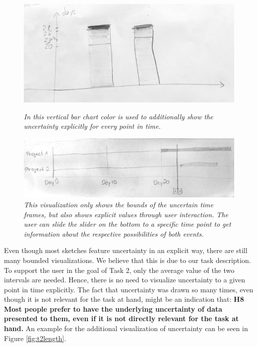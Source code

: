 \begin{figure}[H]
	\begin{minipage}{.5\textwidth}
		\centering
		\captionsetup{width=0.8\textwidth}
		\includegraphics[height=0.4\textwidth]{figures/t2color.jpg}
		\caption{\textit{In this vertical bar chart color is used to additionally show the uncertainty explicitly for every point in time.}}
		\label{fig:t2color}
	\end{minipage}
	\begin{minipage}{.5\textwidth}
		\centering
		\captionsetup{width=1.0\textwidth}
		\includegraphics[height=0.3\textwidth]{figures/t2interaction.jpg}
		\caption{\textit{This visualization only shows the bounds of the uncertain time frames, but also shows explicit values through user interaction. The user can slide the slider on the bottom to a specific time point to get information about the respective possibilities of both events.}}
		\label{fig:t2interaction}
	\end{minipage}
\end{figure}


Even though most sketches feature uncertainty in an explicit way, there are still many bounded visualizations. We believe that this is due to our task description. To support the user in the goal of Task 2, only the average value of the two intervals are needed. Hence, there is no need to visualize uncertainty to a given point in time explicitly. The fact that uncertainty was drawn so many times, even though it is not relevant for the task at hand, might be an indication that: \textbf{H8 Most people prefer to have the underlying uncertainty of data presented to them, even if it is not directly relevant for the task at hand.} An example for the additional visualization of uncertainty can be seen in Figure \ref{fig:t2length}.  \par \medskip

